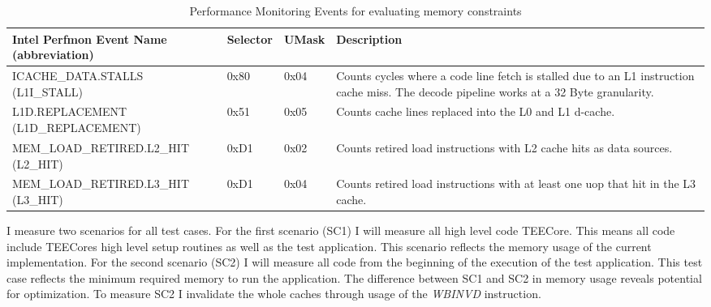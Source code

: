 \begin{table}[ht]
    \centering
    \begin{tabular}{ |p{6cm}|p{1.35cm}|p{1.25cm}|p{4cm}|}
        \hline
        \makecell[l]{Intel Perfmon Event Name                                                                                                 \\ (abbreviation)} & Selector & UMask & Description                                                                      \\
        \hline
        \makecell[l]{ICACHE\_DATA.STALLS                                                                                                      \\(L1I\_STALL)}       & 0x80     & 0x04  & Counts cycles where a code line fetch is stalled due to an L1 instruction cache miss. The decode pipeline works at a 32 Byte granularity. \\
        \makecell[l]{L1D.REPLACEMENT                                                                                                          \\ (L1D\_REPLACEMENT)} & 0x51 & 0x05 & Counts cache lines replaced into the L0 and L1 d-cache.                          \\
        MEM\_LOAD\_RETIRED.L2\_HIT (L2\_HIT) & 0xD1 & 0x02 & Counts retired load instructions with L2 cache hits as data sources.             \\
        MEM\_LOAD\_RETIRED.L3\_HIT (L3\_HIT) & 0xD1 & 0x04 & Counts retired load instructions with at least one uop that hit in the L3 cache. \\
        \hline
    \end{tabular}
    \caption{Performance Monitoring Events for evaluating memory constraints}
    \label{50:tab:events}
\end{table}

I measure two scenarios for all test cases. For the first scenario (SC1) I will
measure all high level code TEECore. This means all code include TEECores high
level setup routines as well as the test application. This scenario reflects the
memory usage of the current implementation. For the second scenario (SC2) I will
measure all code from the beginning of the execution of the test application.
This test case reflects the minimum required memory to run the application. The
difference between SC1 and SC2 in memory usage reveals potential for
optimization. To measure SC2 I invalidate the whole caches through usage of the
\textit{WBINVD} instruction. \\

